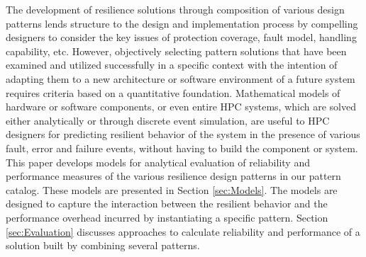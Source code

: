 The development of resilience solutions through composition of various design patterns lends structure to the design and implementation process by compelling designers to consider the key issues of protection coverage, fault model, handling capability, etc. However, objectively selecting pattern solutions that have been examined and utilized successfully in a specific context with the intention of adapting them to a new architecture or software environment of a future system requires criteria based on a quantitative foundation. 
Mathematical models of hardware or software components, or even entire HPC systems, which are solved either analytically or through discrete event simulation, are useful to HPC designers for predicting resilient behavior of the system in the presence of various fault, error and failure events, without having to build the component or system. 
This paper develops models for analytical evaluation of reliability and performance measures of the various resilience design patterns in our pattern catalog. These models are presented in Section \ref{sec:Models}. 
The models are designed to capture the interaction between the resilient behavior and the performance overhead incurred by instantiating a specific pattern. 
Section \ref{sec:Evaluation} discusses approaches to calculate reliability and performance of a solution built by combining several patterns.  


